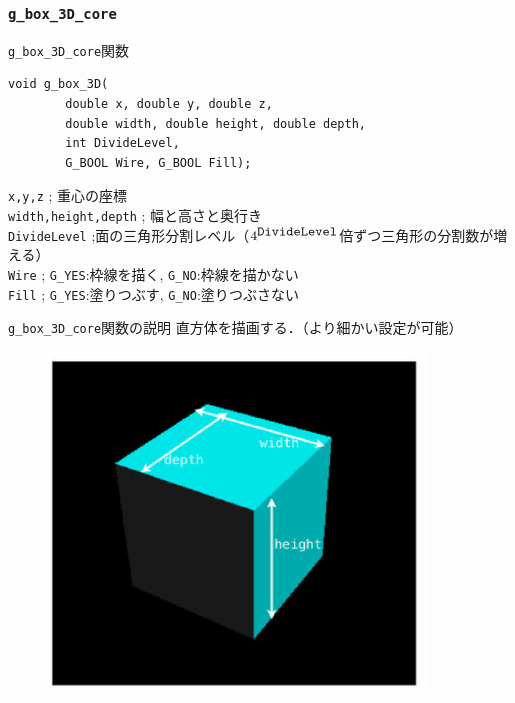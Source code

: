 \documentclass[platex,a4paper,12pt]{jsarticle}%
\begin{document}
\subsubsection{\texttt{g\_box\_3D\_core}}

\begin{itembox}[l]{\texttt{g\_box\_3D\_core}関数}
\begin{verbatim}
void g_box_3D(
        double x, double y, double z,
        double width, double height, double depth,
        int DivideLevel,
        G_BOOL Wire, G_BOOL Fill);   
\end{verbatim}
\verb|x,y,z| ; 重心の座標\\
\verb|width,height,depth| ; 幅と高さと奥行き\\
\verb|DivideLevel| ;面の三角形分割レベル（$4^{\verb|DivideLevel|}$倍ずつ三角形の分割数が増える）\\
\verb|Wire| ; \verb|G_YES|:枠線を描く, \verb|G_NO|:枠線を描かない \\
\verb|Fill| ; \verb|G_YES|:塗りつぶす, \verb|G_NO|:塗りつぶさない
\end{itembox}

\begin{itembox}[l]{\texttt{g\_box\_3D\_core}関数の説明}
直方体を描画する．（より細かい設定が可能）
\end{itembox}
\begin{figure}[htb]
\centering
\includegraphics[width=100mm]{./Figures/eps/Canvas_g_box.eps}
\end{figure}
\end{document}
